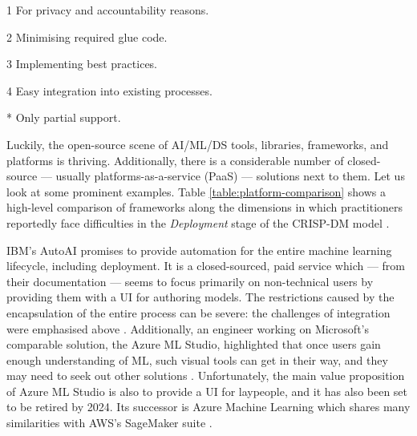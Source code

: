 \begin{table}[H]
\begin{threeparttable}
\begin{tablenotes}
\item[1] For privacy and accountability reasons. \cite{bosch2021engineering}
\item[2] Minimising required glue code. \cite{sculley2015hidden}
\item[3] Implementing best practices. \cite{serban2020adoption,serban2021practices,john2020architecting}
\item[4] Easy integration into existing processes. \cite{haakman2021ai,thiee2021systematic}
\item[*] Only partial support.
\end{tablenotes}
\end{threeparttable}
\end{table}

Luckily, the open-source scene of AI/ML/DS tools, libraries, frameworks, and platforms is thriving. Additionally, there is a considerable number of closed-source --- usually platforms-as-a-service (PaaS) --- solutions next to them. Let us look at some prominent examples. Table \ref{table:platform-comparison} shows a high-level comparison of frameworks along the dimensions in which practitioners reportedly face difficulties in the \textit{Deployment} stage of the CRISP-DM model \cite{wirth2000crisp}.

IBM's AutoAI \cite{wang2020autoai} promises to provide automation for the entire machine learning lifecycle, including deployment. It is a closed-sourced, paid service which --- from their documentation --- seems to focus primarily on non-technical users by providing them with a UI for authoring models. The restrictions caused by the encapsulation of the entire process can be severe: the challenges of integration were emphasised above \cite{sculley2015hidden}. Additionally, an engineer working on Microsoft's comparable solution, the Azure ML Studio, highlighted that once users gain enough understanding of ML, such visual tools can get in their way, and they may need to seek out other solutions \cite{amershi2019software}. Unfortunately, the main value proposition of Azure ML Studio is also to provide a UI for laypeople, and it has also been set to be retired by 2024. Its successor is Azure Machine Learning which shares many similarities with AWS's SageMaker suite \cite{joshi2020amazon}.

